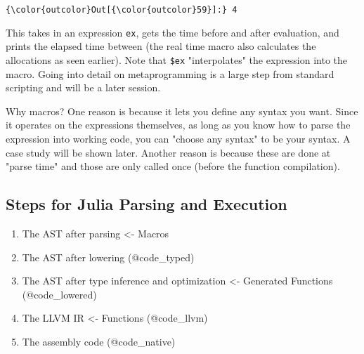 \documentclass[11pt]{article}
\providecommand{\tightlist}{%
      \setlength{\itemsep}{0pt}\setlength{\parskip}{0pt}}
\begin{document}
\begin{Verbatim}[commandchars=\\\{\}]
{\color{outcolor}Out[{\color{outcolor}59}]:} 4
\end{Verbatim}
            
    This takes in an expression \texttt{ex}, gets the time before and after
evaluation, and prints the elapsed time between (the real time macro
also calculates the allocations as seen earlier). Note that
\texttt{\$ex} "interpolates" the expression into the macro. Going into
detail on metaprogramming is a large step from standard scripting and
will be a later session.

Why macros? One reason is because it lets you define any syntax you
want. Since it operates on the expressions themselves, as long as you
know how to parse the expression into working code, you can "choose any
syntax" to be your syntax. A case study will be shown later. Another
reason is because these are done at "parse time" and those are only
called once (before the function compilation).

    \subsection{Steps for Julia Parsing and
Execution}\label{steps-for-julia-parsing-and-execution}

\begin{enumerate}
\def\labelenumi{\arabic{enumi}.}
\tightlist
\item
  The AST after parsing \textless{}- Macros
\item
  The AST after lowering (@code\_typed)
\item
  The AST after type inference and optimization \textless{}- Generated
  Functions (@code\_lowered)
\item
  The LLVM IR \textless{}- Functions (@code\_llvm)
\item
  The assembly code (@code\_native)
\end{enumerate}


    
    
    
    
\end{document}
